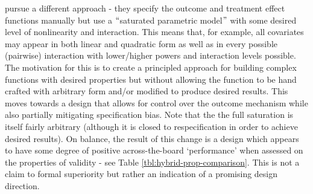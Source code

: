 \documentclass[../main.tex]{subfiles}
\begin{document}
\vspace{\baselineskip}
\textcite{Kern2016AssessingPopulations} pursue a different approach - they specify the outcome and treatment effect functions manually but use a $``$saturated parametric model$"$  with some desired level of nonlinearity and interaction. This means that, for example, all covariates may appear in both linear and quadratic form as well as in every possible (pairwise) interaction with lower/higher powers and interaction levels possible. The motivation for this is to create a principled approach for building complex functions with desired properties but without allowing the function to be hand crafted with arbitrary form and/or modified to produce desired results. This moves towards a design that allows for control over the outcome mechanism while also partially mitigating specification bias. Note that the the full saturation is itself fairly arbitrary (although it is closed to respecification in order to achieve desired results). On balance, the result of this change is a design which appears to have some degree of positive across-the-board ‘performance’ when assessed on the properties of validity - see Table \ref{tbl:hybrid-prop-comparison}. This is not a claim to formal superiority but rather an indication of a promising design direction.\par


\vspace{\baselineskip}


\end{document}
